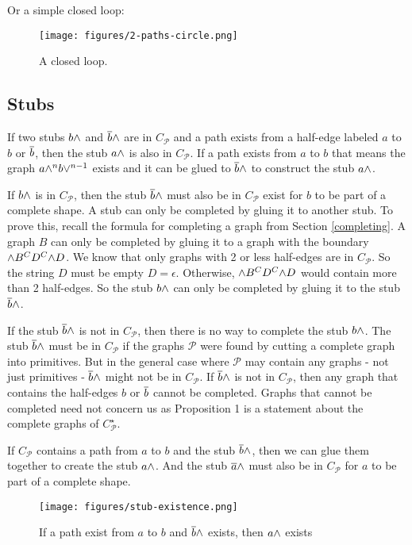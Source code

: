 \documentclass[acmtog]{acmart}
\begin{document}
Or a simple closed loop:

\begin{figure}[H]
\centering
\texttt{[image: figures/2-paths-circle.png]}
\caption{A closed loop.}
\label{loop path}
\end{figure}

\subsection{Stubs}

If two stubs $b {\wedge}$ and $\overline{b} {\wedge}$ are in $C_{\mathcal{P}}$ and a path exists
from a half-edge labeled $a$ to $b$ or $\overline{b}$, then the stub $a {\wedge}$ is also
in $C_{\mathcal{P}}$. If a path exists from $a$ to $b$ that means the graph
$a {\wedge}^n b {\vee}^{n-1}$ exists and it can be glued to $\overline{b} {\wedge}$ to construct
the stub $a {\wedge}$.

If $b {\wedge}$ is in $C_{\mathcal{P}}$, then the stub $\overline{b} {\wedge}$ must also be in
$C_{\mathcal{P}}$ exist for $b$ to be part of a complete shape. A stub can only
be completed by gluing it to another stub. To prove this, recall the formula for
completing a graph from Section \ref{completing}. A graph $B$ can only be
completed by gluing it to a graph with the boundary ${\wedge} B^C D^C {\wedge} D$.
We know that only graphs with 2 or less half-edges are in
$C_{\mathcal{P}}$. So the string $D$ must be empty $D = \epsilon$. Otherwise,
${\wedge} B^C D^C {\wedge} D$ would contain more than 2 half-edges. So the stub $b {\wedge}$
can only be completed by gluing it to the stub $\overline{b} {\wedge}$.

If the stub $\overline{b} {\wedge}$ is not in $C_{\mathcal{P}}$, then there is no way to
complete the stub $b {\wedge}$. The stub $\overline{b} {\wedge}$ must be in $C_{\mathcal{P}}$
if the graphs $\mathcal{P}$ were found by cutting a complete graph into
primitives. But in the general case where $\mathcal{P}$ may contain any graphs -
not just primitives - $\overline{b} {\wedge}$ might not be in $C_{\mathcal{P}}$.
If $\overline{b} {\wedge}$ is not in $C_{\mathcal{P}}$, then any graph that contains the
half-edges $b$ or $\overline{b}$ cannot be completed. Graphs that cannot be completed
need not concern us as Proposition 1 is a statement about the complete graphs of
$C^{\star}_{\mathcal{P}}$.

If $C_{\mathcal{P}}$ contains a path from $a$ to $b$ and the stub $\overline{b} {\wedge}$,
then we can glue them together to create the stub $a {\wedge}$. And the stub
$\overline{a} {\wedge}$ must also be in $C_{\mathcal{P}}$ for $a$ to be part of a complete
shape.

\begin{figure}[H]
\centering
\texttt{[image: figures/stub-existence.png]}
\caption{If a path exist from $a$ to $b$ and $\overline{b} {\wedge}$ exists, then $a {\wedge}$ exists}
\end{figure}
\end{document}
